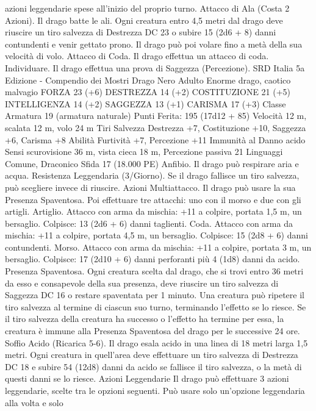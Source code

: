 \begin{multicols}{2}
azioni leggendarie spese all’inizio del proprio turno.
Attacco di Ala (Costa 2 Azioni). Il drago batte le ali. Ogni
creatura entro 4,5 metri dal drago deve riuscire un tiro salvezza
di Destrezza DC 23 o subire 15 (2d6 + 8) danni contundenti e
venir gettato prono. Il drago può poi volare fino a metà della sua
velocità di volo.
Attacco di Coda. Il drago effettua un attacco di coda.
Individuare. Il drago effettua una prova di Saggezza
(Percezione).
SRD Italia 5a Edizione - Compendio dei Mostri
Drago Nero Adulto
Enorme drago, caotico malvagio
FORZA 23 (+6)
DESTREZZA 14 (+2)
COSTITUZIONE 21 (+5)
INTELLIGENZA 14 (+2)
SAGGEZZA 13 (+1)
CARISMA 17 (+3)
Classe Armatura 19 (armatura naturale)
\hspace*{0pt}\hfill{Punti Ferita}: 195 (17d12 + 85)
Velocità 12 m, scalata 12 m, volo 24 m
Tiri Salvezza Destrezza +7, Costituzione +10, Saggezza +6,
Carisma +8
Abilità Furtività +7, Percezione +11
Immunità al Danno acido
Sensi scurovisione 36 m, vista cieca 18 m, Percezione passiva 21
Linguaggi Comune, Draconico
Sfida 17 (18.000 PE)
Anfibio. Il drago può respirare aria e acqua.
Resistenza Leggendaria (3/Giorno). Se il drago fallisce un tiro
salvezza, può scegliere invece di riuscire.
Azioni
Multiattacco. Il drago può usare la sua Presenza Spaventosa. Poi
effettuare tre attacchi: uno con il morso e due con gli artigli.
Artiglio. Attacco con arma da mischia: +11 a colpire, portata 1,5
m, un bersaglio.
Colpisce: 13 (2d6 + 6) danni taglienti.
Coda. Attacco con arma da mischia: +11 a colpire, portata 4,5
m, un bersaglio.
Colpisce: 15 (2d8 + 6) danni contundenti.
Morso. Attacco con arma da mischia: +11 a colpire, portata 3 m,
un bersaglio.
Colpisce: 17 (2d10 + 6) danni perforanti più 4 (1d8) danni da
acido.
Presenza Spaventosa. Ogni creatura scelta dal drago, che si trovi
entro 36 metri da esso e consapevole della sua presenza, deve
riuscire un tiro salvezza di Saggezza DC 16 o restare spaventata
per 1 minuto. Una creatura può ripetere il tiro salvezza al termine
di ciascun suo turno, terminando l’effetto se lo riesce. Se il tiro
salvezza della creatura ha successo o l’effetto ha termine per
essa, la creatura è immune alla Presenza Spaventosa del drago
per le successive 24 ore.
Soffio Acido (Ricarica 5-6). Il drago esala acido in una linea di
18 metri larga 1,5 metri. Ogni creatura in quell’area deve
effettuare un tiro salvezza di Destrezza DC 18 e subire 54 (12d8)
danni da acido se fallisce il tiro salvezza, o la metà di questi
danni se lo riesce.
Azioni Leggendarie
Il drago può effettuare 3 azioni leggendarie, scelte tra le opzioni
seguenti. Può usare solo un’opzione leggendaria alla volta e solo

\end{multicols}
